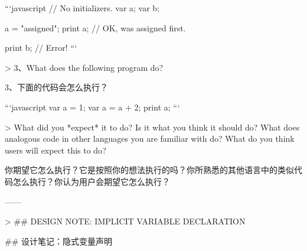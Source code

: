 \documentclass[cn,11pt,chinese]{elegantbook}
\begin{document}
{```javascript
// No initializers.
var a;
var b;

a = "assigned";
print a; // OK, was assigned first.

print b; // Error!
```

> 3、What does the following program do?

3、下面的代码会怎么执行？

```javascript
var a = 1;
{
  var a = a + 2;
  print a;
}
```

> What did you *expect* it to do? Is it what you think it should do? What does analogous code in other languages you are familiar with do? What do you think users will expect this to do?

你期望它怎么执行？它是按照你的想法执行的吗？你所熟悉的其他语言中的类似代码怎么执行？你认为用户会期望它怎么执行？

------

> ## DESIGN NOTE: IMPLICIT VARIABLE DECLARATION

## 设计笔记：隐式变量声明

}
\end{document}
